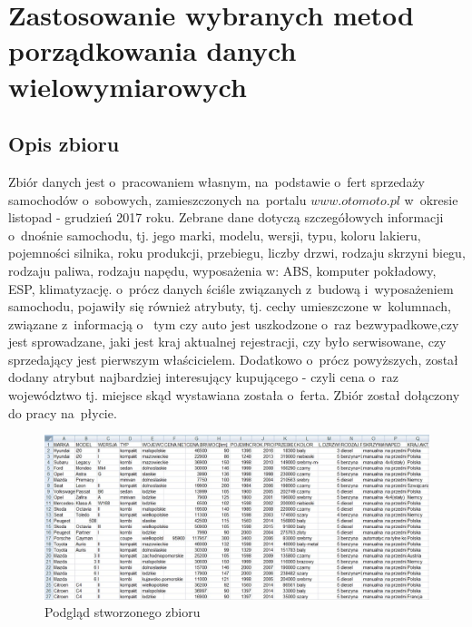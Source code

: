 \documentclass[12pt,a4paper]{report}
\begin{document}
\chapter{Zastosowanie wybranych metod porządkowania danych wielowymiarowych}\label{Zastosowanie}



\section{Opis zbioru}

Zbiór danych jest o~pracowaniem własnym, na~podstawie o~fert sprzedaży samochodów o~sobowych, zamieszczonych na~portalu $www.otomoto.pl$ w~okresie listopad - grudzień 2017 roku. Zebrane dane dotyczą szczegółowych informacji o~dnośnie samochodu, tj. jego marki, modelu, wersji, typu, koloru lakieru, pojemności silnika, roku produkcji, przebiegu, liczby drzwi, rodzaju skrzyni biegu, rodzaju paliwa, rodzaju napędu, wyposażenia w: ABS, komputer pokładowy, ESP, klimatyzację. o~prócz danych ściśle związanych z~budową i~wyposażeniem samochodu, pojawiły się również atrybuty, tj. cechy umieszczone w~kolumnach, związane z~informacją o~ tym czy auto jest uszkodzone o~raz bezwypadkowe,czy jest sprowadzane, jaki jest kraj aktualnej rejestracji, czy było serwisowane, czy sprzedający jest pierwszym właścicielem. Dodatkowo o~prócz powyższych, został dodany atrybut najbardziej interesujący kupującego - czyli cena o~raz województwo tj. miejsce skąd wystawiana została o~ferta. Zbiór został dołączony do pracy na~płycie. 
\begin{figure}[h]
\centering
\includegraphics[width=1\textwidth]{img/zbior3.jpg}
\caption{Podgląd stworzonego zbioru}
\label{fig:obrazek1}
\end{figure}
\end{document}

